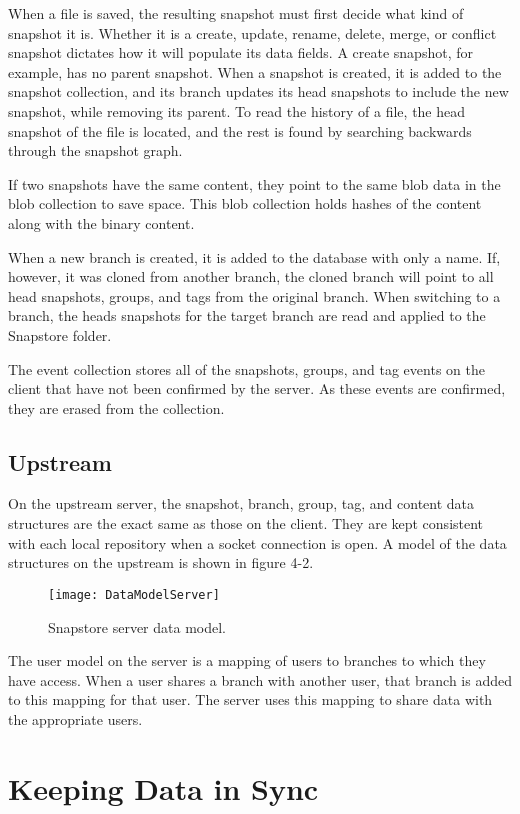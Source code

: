 When a file is saved, the resulting snapshot must first decide what kind of snapshot it is. Whether it is a create, update, rename, delete, merge, or conflict snapshot dictates how it will populate its data fields. A create snapshot, for example, has no parent snapshot. When a snapshot is created, it is added to the snapshot collection, and its branch updates its head snapshots to include the new snapshot, while removing its parent. To read the history of a file, the head snapshot of the file is located, and the rest is found by searching backwards through the snapshot graph.

If two snapshots have the same content, they point to the same blob data in the blob collection to save space. This blob collection holds hashes of the content along with the binary content.

When a new branch is created, it is added to the database with only a name. If, however, it was cloned from another branch, the cloned branch will point to all head snapshots, groups, and tags from the original branch. When switching to a branch, the heads snapshots for the target branch are read and applied to the Snapstore folder.

The event collection stores all of the snapshots, groups, and tag events on the client that have not been confirmed by the server. As these events are confirmed, they are erased from the collection.

\subsection{Upstream}

On the upstream server, the snapshot, branch, group, tag, and content data structures are the exact same as those on the client. They are kept consistent with each local repository when a socket connection is open. A model of the data structures on the upstream is shown in figure 4-2.

\begin{figure}
\texttt{[image: DataModelServer]}
\caption{Snapstore server data model.}
\label{arm:fig1}
\end{figure}

The user model on the server is a mapping of users to branches to which they have access. When a user shares a branch with another user, that branch is added to this mapping for that user. The server uses this mapping to share data with the appropriate users.

\section{Keeping Data in Sync}

